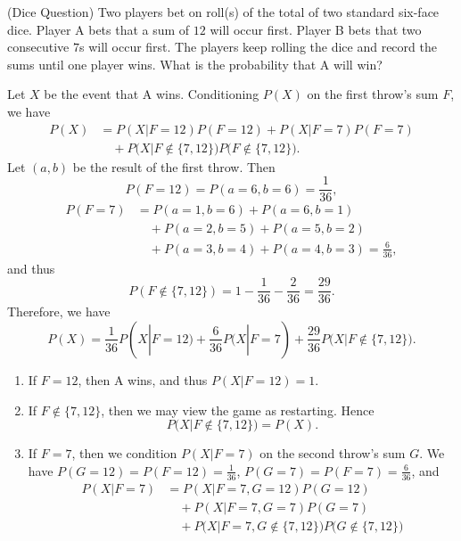 \documentclass[12pt,letterpaper, onecolumn]{exam}
\begin{document}
\begin{questions}
        \question[](Dice Question) Two players bet on roll(s) of the total of two standard six-face dice. Player A bets that a sum of $12$ will occur first. Player B bets that two consecutive $7$s will occur first. The players keep rolling the dice and record the sums until one player wins. What is the probability that A will win?
        \begin{solution}
            Let $X$ be the event that A wins. Conditioning $P(X)$ on the first throw's sum $F$, we have
            \begin{align*}
                P(X)&=P(X|F=12)P(F=12)+P(X|F=7)P(F=7)\\
                &\quad +P\Big(X|F\not\in\{7,12\}\Big)P\Big(F\not\in\{7,12\}\Big).
            \end{align*}
            Let $(a,b)$ be the result of the first throw. Then
            $$P(F=12)=P(a=6,b=6)=\frac{1}{36},$$
            \begin{align*}
                P(F=7)&=P(a=1,b=6)+P(a=6,b=1)\\
                &\quad + P(a=2,b=5)+P(a=5,b=2)\\
                &\quad + P(a=3,b=4)+P(a=4,b=3)=\frac{6}{36},
            \end{align*}
            and thus 
            $$P(F\not\in\{7,12\})=1-\frac{1}{36}-\frac{2}{36}=\frac{29}{36}.$$
            Therefore, we have 
            \begin{equation}\label{20250213equation8}
                P(X)=\frac{1}{36}P(X|F=12)+\frac{6}{36}P(X|F=7)+\frac{29}{36}P\Big(X|F\not\in\{7,12\}\Big).
            \end{equation}
            \begin{enumerate}
                \item If $F=12$, then A wins, and thus $P(X|F=12)=1$.
                \item If $F\not\in\{7,12\}$, then we may view the game as restarting. Hence
                $$P\Big(X|F\not\in\{7,12\}\Big)=P(X).$$
                \item If $F=7$, then we condition $P(X|F=7)$ on the second throw's sum $G$. We have $P(G=12)=P(F=12)=\frac{1}{36}$, $P(G=7)=P(F=7)=\frac{6}{36}$, and 
                \begin{align*}
                    P(X|F=7)&=P(X|F=7,G=12)P(G=12)\\
                    &\quad +P(X|F=7,G=7)P(G=7)\\
                    &\quad+P\Big(X|F=7,G\not\in\{7,12\}\Big)P\Big(G\not\in\{7,12\}\Big)\\

\end{align*}
\end{enumerate}
\end{solution}
\end{questions}
\end{document}
